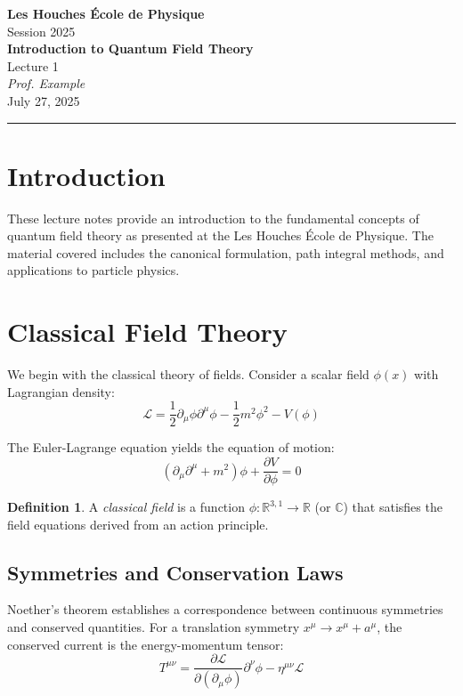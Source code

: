 \documentclass[11pt,a4paper]{article}
\makeatletter
\theoremstyle{definition}
\newtheorem{definition}{Definition}[section]
\newcommand{\lecturetitle}[1]{\def\@lecturetitle{#1}}
\newcommand{\lecturer}[1]{\def\@lecturer{#1}}
\newcommand{\lecturedate}[1]{\def\@lecturedate{#1}}
\newcommand{\lecturenumber}[1]{\def\@lecturenumber{#1}\def\thelecturenumber{#1}}
\renewcommand{\maketitle}{
    \begin{center}
        {\Large\textcolor{leshouches}{\textbf{Les Houches École de Physique}}}\\[0.5em]
        {\large Session 2025}\\[1.5em]
        {\huge\textbf{\@lecturetitle}}\\[0.5em]
        {\large Lecture \@lecturenumber}\\[1em]
        {\large\textit{\@lecturer}}\\[0.5em]
        {\@lecturedate}
    \end{center}
    \vspace{1em}
    \hrule
    \vspace{1.5em}
}
\makeatother
\begin{document}
\lecturetitle{Introduction to Quantum Field Theory}
\lecturer{Prof. Example}
\lecturedate{July 27, 2025}
\lecturenumber{1}

\maketitle

\section{Introduction}

These lecture notes provide an introduction to the fundamental concepts of quantum field theory as presented at the Les Houches École de Physique. The material covered includes the canonical formulation, path integral methods, and applications to particle physics.

\section{Classical Field Theory}

We begin with the classical theory of fields. Consider a scalar field $\phi(x)$ with Lagrangian density:
\begin{equation}
    \mathcal{L} = \frac{1}{2}\partial_\mu\phi\partial^\mu\phi - \frac{1}{2}m^2\phi^2 - V(\phi)
\end{equation}

The Euler-Lagrange equation yields the equation of motion:
\begin{equation}
    \left(\partial_\mu\partial^\mu + m^2\right)\phi + \frac{\partial V}{\partial \phi} = 0
\end{equation}

\begin{definition}
A \emph{classical field} is a function $\phi: \mathbb{R}^{3,1} \to \mathbb{R}$ (or $\mathbb{C}$) that satisfies the field equations derived from an action principle.
\end{definition}

\subsection{Symmetries and Conservation Laws}

Noether's theorem establishes a correspondence between continuous symmetries and conserved quantities. For a translation symmetry $x^\mu \to x^\mu + a^\mu$, the conserved current is the energy-momentum tensor:
\begin{equation}
    T^{\mu\nu} = \frac{\partial \mathcal{L}}{\partial(\partial_\mu\phi)}\partial^\nu\phi - \eta^{\mu\nu}\mathcal{L}
\end{equation}
\end{document}
